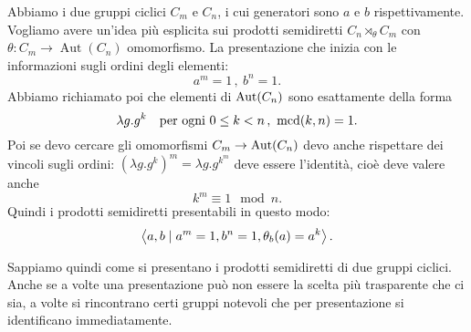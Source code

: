 \begin{esem}\label{esem:PresentazioneSemidirettoGruppiCiclici}
Abbiamo i due gruppi ciclici \(C_m\) e \(C_n\), i cui generatori sono \(a\) e \(b\) rispettivamente. Vogliamo avere un'idea più esplicita sui prodotti semidiretti $C_n \rtimes_\theta C_m$ con $\theta : C_m \to \operatorname{Aut}(C_n)$ omomorfismo. La presentazione che inizia con le informazioni sugli ordini degli elementi:
\[a^m = 1 \,,\ b^n = 1 .\]
Abbiamo richiamato poi che elementi di $\mathrm{Aut}(C_n)$ sono esattamente della forma
\[\lambda g. g^k \quad\text{per ogni } 0 \le k < n \,,\ \operatorname{mcd}(k, n) = 1 .\]
Poi se devo cercare gli omomorfismi $C_m \to \mathrm{Aut}(C_n)$ devo anche rispettare dei vincoli sugli ordini: $\left(\lambda g. g^k\right)^m = \lambda g . g^{k^m}$ deve essere l'identità, cioè deve valere anche
\[k^m \equiv 1 \mod n .\] 
 Quindi i prodotti semidiretti presentabili in questo modo:
\[\left\langle a, b \mid a^m = 1, b^n = 1, \theta_b(a) = a^k\right\rangle .\]
\end{esem}

Sappiamo quindi come si presentano i prodotti semidiretti di due gruppi ciclici. Anche se a volte una presentazione può non essere la scelta più trasparente che ci sia, a volte si rincontrano certi gruppi notevoli che per presentazione si identificano immediatamente.




